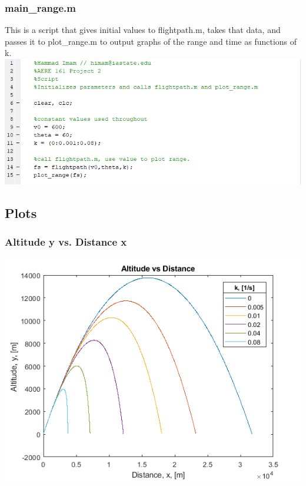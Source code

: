 \documentclass[oneside]{article}
\begin{document}
\subsubsection{main\_range.m}
This is a script that gives initial values to flightpath.m, takes that data, and passes it to plot\_range.m to output graphs of the range and time as functions of k.\\
\includegraphics [width=\linewidth]{code_main_range.png}
\newpage
\subsection{Plots}
\subsubsection{Altitude y vs. Distance x}
\includegraphics [width=\linewidth*4/5]{graph_y-x.png}
\end{document}
